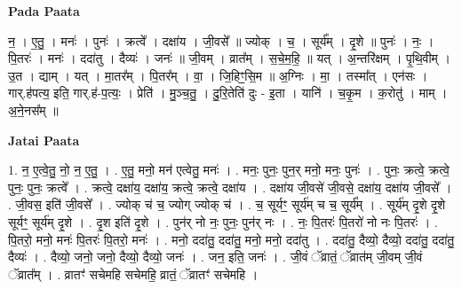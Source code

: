 \documentclass[17pt]{extarticle}
\begin{document}
\textbf{Pada Paata} \newline

न॒ । ए॒तु॒ । मनः॑ । पुनः॑ । क्रत्वे᳚ । दक्षा॑य । जी॒वसे᳚ ॥ ज्योक् । च॒ । सूर्य᳚म् । दृ॒शे ॥ पुनः॑ । नः॒ । पि॒तरः॑ । मनः॑ । ददा॑तु । दैव्यः॑ । जनः॑ ॥ जी॒वम् । व्रात᳚म् । स॒चे॒म॒हि॒ ॥ यत् । अ॒न्तरि॑क्षम् । पृ॒थि॒वीम् । उ॒त । द्याम् । यत् । मा॒तर᳚म् । पि॒तर᳚म् । वा॒ । जि॒हिꣳ॒॒सि॒म ॥ अ॒ग्निः । मा॒ । तस्मा᳚त् । एन॑सः । गार्.ह॑पत्य॒ इति॒ गार्.ह॑-प॒त्यः॒ । प्रेति॑ । मु॒ञ्च॒तु॒ । दु॒रि॒तेति॑ दुः - इ॒ता । यानि॑ । च॒कृ॒म । क॒रोतु॑ । माम् । अ॒ने॒नस᳚म् ॥  \newline



\textbf{Jatai Paata} \newline

1. न॒ ए॒त्वे॒तु॒ नो॒ न॒ ए॒तु॒ । . ए॒तु॒ मनो॒ मन॑ एत्वेतु॒ मनः॑ । . मनः॒ पुनः॒ पुन॒र् मनो॒ मनः॒ पुनः॑ । . पुनः॒ क्रत्वे॒ क्रत्वे॒ पुनः॒ पुनः॒ क्रत्वे᳚ । . क्रत्वे॒ दक्षा॑य॒ दक्षा॑य॒ क्रत्वे॒ क्रत्वे॒ दक्षा॑य । . दक्षा॑य जी॒वसे॑ जी॒वसे॒ दक्षा॑य॒ दक्षा॑य जी॒वसे᳚ । . जी॒वस॒ इति॑ जी॒वसे᳚ । . ज्योक् च॑ च॒ ज्योग् ज्योक् च॑ । . च॒ सूर्यꣳ॒॒ सूर्य॑म् च च॒ सूर्य᳚म् । . सूर्य॑म् दृ॒शे दृ॒शे सूर्यꣳ॒॒ सूर्य॑म् दृ॒शे । . दृ॒श इति॑ दृ॒शे । . पुन॑र् नो नः॒ पुनः॒ पुन॑र् नः । . नः॒ पि॒तरः॑ पि॒तरो॑ नो नः पि॒तरः॑ । . पि॒तरो॒ मनो॒ मनः॑ पि॒तरः॑ पि॒तरो॒ मनः॑ । . मनो॒ ददा॑तु॒ ददा॑तु॒ मनो॒ मनो॒ ददा॑तु । . ददा॑तु॒ दैव्यो॒ दैव्यो॒ ददा॑तु॒ ददा॑तु॒ दैव्यः॑ । . दैव्यो॒ जनो॒ जनो॒ दैव्यो॒ दैव्यो॒ जनः॑ । . जन॒ इति॒ जनः॑ । . जी॒वं ॅव्रातं॒ ॅव्रात॑म् जी॒वम् जी॒वं ॅव्रात᳚म् । . व्रातꣳ॑ सचेमहि सचेमहि॒ व्रातं॒ ॅव्रातꣳ॑ सचेमहि । \newline
\end{document}
